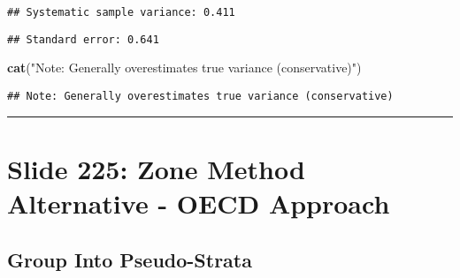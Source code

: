 \documentclass[
]{article}
\newenvironment{Shaded}{\begin{snugshade}}{\end{snugshade}}
\newcommand{\DecValTok}[1]{\textcolor[rgb]{0.00,0.00,0.81}{#1}}
\newcommand{\FunctionTok}[1]{\textcolor[rgb]{0.13,0.29,0.53}{\textbf{#1}}}
\newcommand{\NormalTok}[1]{#1}
\newcommand{\SpecialCharTok}[1]{\textcolor[rgb]{0.81,0.36,0.00}{\textbf{#1}}}
\newcommand{\StringTok}[1]{\textcolor[rgb]{0.31,0.60,0.02}{#1}}
\begin{document}
\begin{verbatim}
## Systematic sample variance: 0.411
\end{verbatim}

\begin{Shaded}
\end{Shaded}

\begin{verbatim}
## Standard error: 0.641
\end{verbatim}

\begin{Shaded}
\begin{Highlighting}[]
\FunctionTok{cat}\NormalTok{(}\StringTok{"Note: Generally overestimates true variance (conservative)"}\NormalTok{)}
\end{Highlighting}
\end{Shaded}

\begin{verbatim}
## Note: Generally overestimates true variance (conservative)
\end{verbatim}

\begin{center}\rule{0.5\linewidth}{0.5pt}\end{center}

\section{Slide 225: Zone Method Alternative - OECD
Approach}\label{slide-225-zone-method-alternative---oecd-approach}

\subsection{Group Into Pseudo-Strata}\label{group-into-pseudo-strata}
\end{document}
